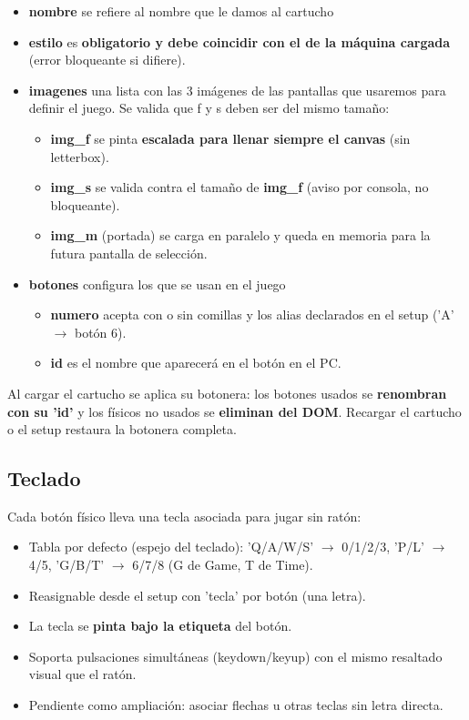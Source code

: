 	\begin{itemize}
		\item \textbf{nombre} se refiere al nombre que le damos al cartucho
		\item \textbf{estilo} es \textbf{obligatorio y debe coincidir con el de la máquina cargada} (error bloqueante si difiere).
		\item \textbf{imagenes} una lista con las 3 imágenes de las pantallas que usaremos para definir el juego. Se valida que f y s deben ser del mismo tamaño:
		\begin{itemize}
			\item \textbf{img\_f} se pinta \textbf{escalada para llenar siempre el canvas} (sin letterbox).
			\item \textbf{img\_s} se valida contra el tamaño de \textbf{img\_f} (aviso por consola, no bloqueante).
			\item \textbf{img\_m} (portada) se carga en paralelo y queda en memoria para la futura pantalla de selección.
		\end{itemize}
		\item \textbf{botones} configura los que se usan en el juego
		\begin{itemize}
			\item \textbf{numero} acepta con o sin comillas y los alias declarados en el setup ('A' $\rightarrow$ botón 6).
			\item \textbf{id} es el nombre que aparecerá en el botón en el PC.
		\end{itemize}
	\end{itemize}
	
	Al cargar el cartucho se aplica su botonera: los botones usados se \textbf{renombran con su 'id'} y los físicos no usados se \textbf{eliminan del DOM}. Recargar el cartucho o el setup restaura la botonera completa.
	
	\subsection{Teclado}
	
	Cada botón físico lleva una tecla asociada para jugar sin ratón:
	\begin{itemize}
		\item Tabla por defecto (espejo del teclado): 'Q/A/W/S' $\rightarrow$ 0/1/2/3, 'P/L' $\rightarrow$ 4/5, 'G/B/T' $\rightarrow$ 6/7/8 (G de Game, T de Time).
		\item Reasignable desde el setup con 'tecla' por botón (una letra).
		\item La tecla se \textbf{pinta bajo la etiqueta} del botón.
		\item Soporta pulsaciones simultáneas (keydown/keyup) con el mismo resaltado visual que el ratón.
		\item Pendiente como ampliación: asociar flechas u otras teclas sin letra directa.
	\end{itemize}
	
